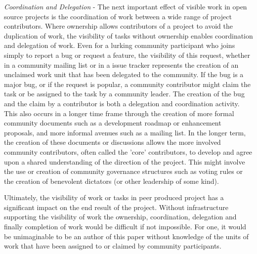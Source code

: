{\it Coordination and Delegation} - The next important effect of visible work in open source projects is the coordination of work between a wide range of project contributors. Where ownership allows contributors of a project to avoid the duplication of work, the visibility of tasks without ownership enables coordination and delegation of work. Even for a lurking community participant who joins simply to report a bug or request a feature, the visibility of this request, whether in a community mailing list or in a issue tracker represents the creation of an unclaimed work unit that has been delegated to the community. If the bug is a major bug, or if the request is popular, a community contributor might claim the task or be assigned to the task by a community leader. The creation of the bug and the claim by a contributor is both a delegation and coordination activity. This also occurs in a longer time frame through the creation of more formal community documents such as a development roadmap or enhancement proposals, and more informal avenues such as a mailing list. In the longer term, the creation of these documents or discussions allows the more involved community contributors, often called the 'core' contributors, to develop and agree upon a shared understanding of the direction of the project. This might involve the use or creation of community governance structures such as voting rules or the creation of benevolent dictators (or other leadership of some kind).

Ultimately, the visibility of work or tasks in peer produced project has a significant impact on the end result of the project. Without infrastructure supporting the visibility of work the ownership, coordination, delegation and finally completion of work would be difficult if not impossible. For one, it would be unimaginable to be an author of this paper without knowledge of the units of work that have been assigned to or claimed by community participants.
